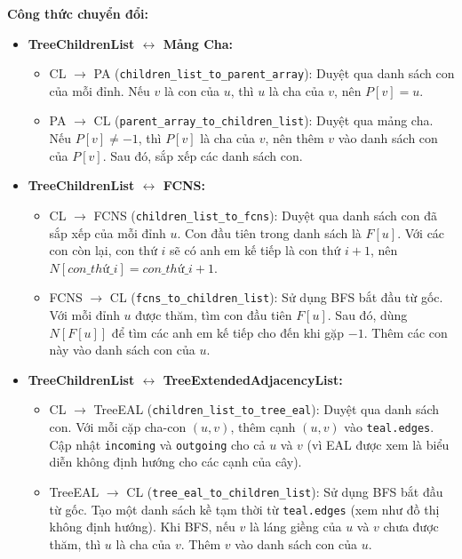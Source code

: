 \documentclass{article}
\begin{document}
\textbf{Công thức chuyển đổi:}

\begin{itemize}
    \item \textbf{TreeChildrenList $\leftrightarrow$ Mảng Cha:}
    \begin{itemize}
        \item CL $\to$ PA (\texttt{children\_list\_to\_parent\_array}): Duyệt qua danh sách con của mỗi đỉnh. Nếu $v$ là con của $u$, thì $u$ là cha của $v$, nên $P[v] = u$.
        \item PA $\to$ CL (\texttt{parent\_array\_to\_children\_list}): Duyệt qua mảng cha. Nếu $P[v] \neq -1$, thì $P[v]$ là cha của $v$, nên thêm $v$ vào danh sách con của $P[v]$. Sau đó, sắp xếp các danh sách con.
    \end{itemize}
    \item \textbf{TreeChildrenList $\leftrightarrow$ FCNS:}
    \begin{itemize}
        \item CL $\to$ FCNS (\texttt{children\_list\_to\_fcns}): Duyệt qua danh sách con đã sắp xếp của mỗi đỉnh $u$. Con đầu tiên trong danh sách là $F[u]$. Với các con còn lại, con thứ $i$ sẽ có anh em kế tiếp là con thứ $i+1$, nên $N[con\_thứ\_i] = con\_thứ\_i+1$.
        \item FCNS $\to$ CL (\texttt{fcns\_to\_children\_list}): Sử dụng BFS bắt đầu từ gốc. Với mỗi đỉnh $u$ được thăm, tìm con đầu tiên $F[u]$. Sau đó, dùng $N[F[u]]$ để tìm các anh em kế tiếp cho đến khi gặp $-1$. Thêm các con này vào danh sách con của $u$.
    \end{itemize}
    \item \textbf{TreeChildrenList $\leftrightarrow$ TreeExtendedAdjacencyList:}
    \begin{itemize}
        \item CL $\to$ TreeEAL (\texttt{children\_list\_to\_tree\_eal}): Duyệt qua danh sách con. Với mỗi cặp cha-con $(u,v)$, thêm cạnh $(u,v)$ vào \texttt{teal.edges}. Cập nhật \texttt{incoming} và \texttt{outgoing} cho cả $u$ và $v$ (vì EAL được xem là biểu diễn không định hướng cho các cạnh của cây).
        \item TreeEAL $\to$ CL (\texttt{tree\_eal\_to\_children\_list}): Sử dụng BFS bắt đầu từ gốc. Tạo một danh sách kề tạm thời từ \texttt{teal.edges} (xem như đồ thị không định hướng). Khi BFS, nếu $v$ là láng giềng của $u$ và $v$ chưa được thăm, thì $u$ là cha của $v$. Thêm $v$ vào danh sách con của $u$.
    \end{itemize}
\end{itemize}
\end{document}
